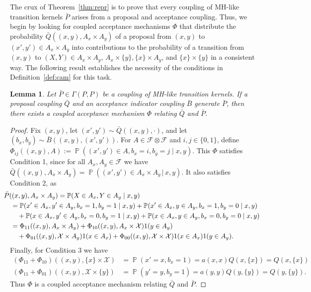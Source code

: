 \documentclass[aihp]{imsart}
\theoremstyle{plain}
\newtheorem{lemma}[theorem]{Lemma}
\theoremstyle{remark}
\theoremstyle{definition} \newtheorem{example}{Example}
\newcommand{\eq}[1]{\begin{align*}#1\end{align*}} %
\renewcommand{\P}{\operatorname{\mathbb{P}}}
\newcommand{\scrF}{\mathscr{F}}
\newcommand{\calX}{\mathcal{X}}
\newcommand{\calXp}{\calX \times \calX}
\newcommand{\scrFp}{\scrF \otimes \scrF}
\newcommand{\bp}{\bar P}
\newcommand{\bq}{\bar Q}
\newcommand{\bb}{\bar B}
\newcommand{\sx}{\{ x \}}
\newcommand{\sy}{\{ y \}}
\newcommand{\xy}{(x,y)}
\newcommand{\XY}{(X,Y)}
\newcommand{\xyp}{(x',y')}
\newcommand{\axy}{A_x \times A_y}
\begin{document}
The crux of Theorem~\ref{thm:repr} is to prove that every coupling of MH-like transition kernels
$\bp$ arises from a proposal and acceptance coupling. Thus, we begin by looking for coupled
acceptance mechanisms $\Phi$ that distribute the probability $\bq(\xy, \axy)$ of a proposal from
$\xy$ to $\xyp \in \axy$ into contributions to the probability of a transition from $\xy$ to $\XY
\in \axy$, $A_x \times \sy, \sx \times A_y$, and $\sx \times \sy$ in a consistent way. The following
result establishes the necessity of the conditions in Definition~\ref{def:cam} for this task.

\smallskip

\begin{lemma}
\label{lem:generation}
Let $\bp \in \Gamma(P,P)$ be a coupling of MH-like transition kernels.
If a proposal coupling $\bq$ and an acceptance indicator coupling $\bb$ generate $\bp$,
then there exists a coupled acceptance mechanism $\Phi$
relating $\bq$ and $\bp$.
\end{lemma}

\begin{proof}
Fix $\xy$, let $(x', y') \sim \bq(\xy, \cdot)$, and let $(b_x, b_y) \sim \bb(\xy, \xyp)$.
For $A \in \scrFp$ and $i, j \in \{0,1\}$, define $\Phi_{ij}(\xy, A) := \P( \xyp \in A, b_x = i, b_y = j \mid x,y)$.
This $\Phi$ satisfies Condition 1, since for all $A_x, A_y \in \scrF$ we have
$\bq(\xy, \axy) = \P(\xyp \in \axy \, | \, x,y)$.
It also satisfies Condition 2, as
\eq{
	& \hspace{-1em} \bp(\xy, \axy) = \P(X \in A_x, Y \in A_y \mid x,y) \\
	& = \P(x' \in A_x, y' \in A_y, b_x=1, b_y=1 \mid x,y)
	+ \P(x' \in A_x, y \in A_y, b_x=1, b_y=0 \mid x,y) \\
	& \quad + \P(x \in A_x, y' \in A_y, b_x=0, b_y=1 \mid x,y)
	+ \P(x \in A_x, y \in A_y, b_x=0, b_y=0 \mid x,y) \\
	& = \Phi_{11}(\xy, \axy)
	+ \Phi_{10}(\xy, A_x \times \calX) 1(y \in A_y) \\
	& \quad + \Phi_{01}(\xy, \calX \times A_y) 1(x \in A_x)
	+ \Phi_{00}(\xy, \calXp) 1(x \in A_x) 1(y \in A_y).
}
Finally, for Condition 3 we have
\eq{
	( \Phi_{11} + \Phi_{10})(\xy, \sx \times \calX) &= \P(x' = x, b_x = 1) = a(x,x) Q(x, \sx) = Q(x,\sx) \\
	( \Phi_{11} + \Phi_{01})(\xy, \calX \times \sy) &= \P(y' = y, b_y = 1) = a(y,y) Q(y, \sy) = Q(y,\sy).
}
Thus $\Phi$ is a coupled acceptance mechanism relating $\bq$ and $\bp$.
\end{proof}
\end{document}
